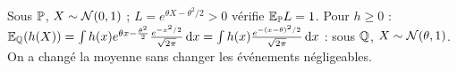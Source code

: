 \documentclass[11pt,a4paper]{article}
\begin{document}
\begin{exemple}\label{C7:ex-gauss}
Sous $\mathbb{P}$, $X\sim\mathcal{N}(0,1)$ ; $L=e^{\theta X-\theta^2/2}>0$ vérifie $\mathbb{E}_{\mathbb{P}} L=1$. Pour $h\ge0$ :
$\mathbb{E}_{\mathbb{Q}}(h(X))=\int h(x)e^{\theta x-\frac{\theta^2}2}\frac{e^{-x^2/2}}{\sqrt{2\pi}}\,\mathrm{d} x=\int h(x)\frac{e^{-(x-\theta)^2/2}}{\sqrt{2\pi}}\,\mathrm{d} x$ :
sous $\mathbb{Q}$, $X\sim\mathcal{N}(\theta,1)$. On a changé la moyenne sans changer les événements négligeables.
\end{exemple}
\end{document}
